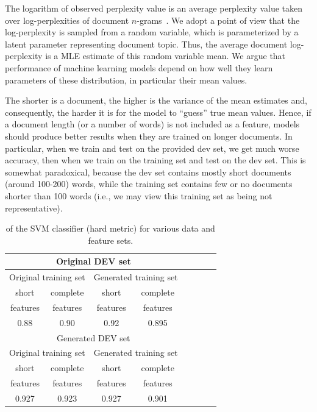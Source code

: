 \documentclass[11pt]{article}
\newcommand{\ngrams}{\mbox{$n$-grams }}
\begin{document}
The logarithm of observed perplexity value 
is an average perplexity value taken over log-perplexities of document \ngrams.
We adopt a point of view that the log-perplexity is sampled from a random variable,
which is parameterized by a latent parameter representing document topic.
Thus, the average document log-perplexity is a MLE estimate of this random variable mean.
We argue that performance of machine learning models depend on how
well they learn parameters of these distribution, in particular their mean values.

The shorter is a document, the higher is the variance of the mean estimates
and, consequently, the harder it is for the model to ``guess'' true mean values.
Hence, if a document length (or a number of words)
is not included as a feature,
models should produce better results when they are trained on longer documents.
In particular, when we train and test on the provided dev set, we get much worse
accuracy, then when we train on the training set and test on the dev set.
This is somewhat paradoxical, because the dev set contains mostly short documents (around 100-200)
words, while the training set contains few or no documents shorter than 100 words
(i.e., we may view this training set as being not representative).

\begin{table}
\caption{\label{TablePerm}  of the SVM classifier (hard metric) for various data and feature sets.}
\begin{tabular}{c|c|c|c|c|c|c|c}\hline
\multicolumn{4}{c}{Original DEV set} \\\hline\hline
\multicolumn{2}{c|}{Original training set} & \multicolumn{2}{c}{Generated training set} \\\hline
short & complete & short & complete  \\
features & features & features & features \\\hline
0.88  & 0.90 & 0.92 &  0.895  \\\hline
\multicolumn{4}{c}{Generated DEV set} \\\hline\hline
\multicolumn{2}{c|}{Original training set} & \multicolumn{2}{c}{Generated training set} \\\hline
short & complete & short & complete  \\
features & features & features & features \\\hline
0.927 & 0.923   & 0.927 & 0.901  \\\hline
\end{tabular}
\end{table}
\end{document}
